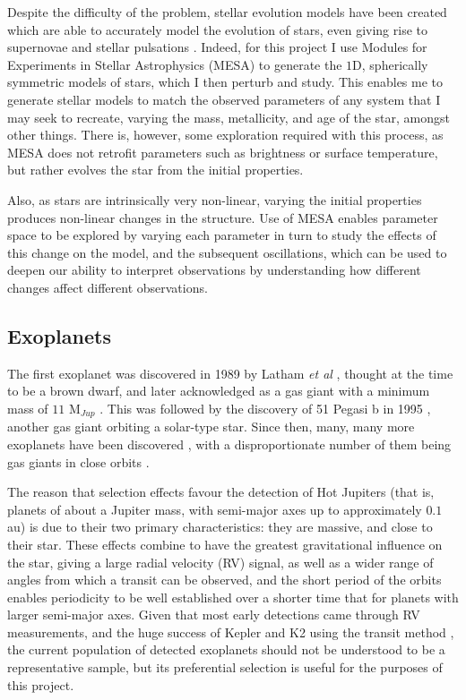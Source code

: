 \documentclass[11pt]{amsart}
\begin{document}
Despite the difficulty of the problem, stellar evolution models have been created which are able to accurately model the evolution of stars, even giving rise to supernovae and stellar pulsations \cite{Paxton2015}.  Indeed, for this project I use Modules for Experiments in Stellar Astrophysics (MESA) \cite{Paxton2011} to generate the $1$D, spherically symmetric models of stars, which I then perturb and study.  This enables me to generate stellar models to match the observed parameters of any system that I may seek to recreate, varying the mass, metallicity, and age of the star, amongst other things.  There is, however, some exploration required with this process, as MESA does not retrofit parameters such as brightness or surface temperature, but rather evolves the star from the initial properties.

Also, as stars are intrinsically very non-linear, varying the initial properties produces non-linear changes in the structure.  Use of MESA enables parameter space to be explored by varying each parameter in turn to study the effects of this change on the model, and the subsequent oscillations, which can be used to deepen our ability to interpret observations by understanding how different changes affect different observations.




\subsection{Exoplanets} \label{Intro:Exoplanets}

The first exoplanet was discovered in 1989 by Latham \textit{et al} \cite{Latham1989}, thought at the time to be a brown dwarf, and later acknowledged as a gas giant with a minimum mass of $11$ M$_{Jup}$ \cite{Wang2012}.  This was followed by the discovery of 51 Pegasi b in 1995 \cite{Mayor1995}, another gas giant orbiting a solar-type star.  Since then, many, many more exoplanets have been discovered \cite{NASAExoplanet}, with a disproportionate number of them being gas giants in close orbits \cite{Winn2014}.

The reason that selection effects favour the detection of Hot Jupiters (that is, planets of about a Jupiter mass, with semi-major axes up to approximately $0.1$ au) is due to their two primary characteristics: they are massive, and close to their star.  These effects combine to have the greatest gravitational influence on the star, giving a large radial velocity (RV) signal, as well as a wider range of angles from which a transit can be observed, and the short period of the orbits enables periodicity to be well established over a shorter time that for planets with larger semi-major axes.  Given that most early detections came through RV measurements, and the huge success of Kepler and K2 using the transit method \cite{Coughlin2016}, the current population of detected exoplanets should not be understood to be a representative sample, but its preferential selection is useful for the purposes of this project.
\end{document}
